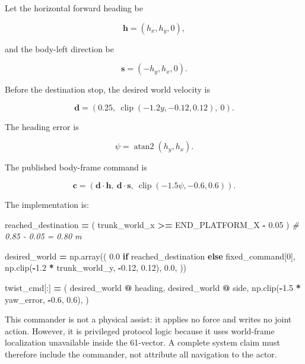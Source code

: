 \documentclass[
  american,
  11pt,
  letterpaper,
]{article}
\newenvironment{Shaded}{\begin{snugshade}}{\end{snugshade}}
\newcommand{\CommentTok}[1]{\textcolor[rgb]{0.56,0.35,0.01}{\textit{#1}}}
\newcommand{\ControlFlowTok}[1]{\textcolor[rgb]{0.13,0.29,0.53}{\textbf{#1}}}
\newcommand{\DecValTok}[1]{\textcolor[rgb]{0.00,0.00,0.81}{#1}}
\newcommand{\FloatTok}[1]{\textcolor[rgb]{0.00,0.00,0.81}{#1}}
\newcommand{\NormalTok}[1]{#1}
\newcommand{\OperatorTok}[1]{\textcolor[rgb]{0.81,0.36,0.00}{\textbf{#1}}}
\renewenvironment{Shaded}{\par\smallskip}{\par\smallskip}
\begin{document}
Let the horizontal forward heading be

\[
\mathbf h=(h_x,h_y,0),
\]

and the body-left direction be

\[
\mathbf s=(-h_y,h_x,0).
\]

Before the destination stop, the desired world velocity is

\[
\mathbf d=
\left(
0.25,\
\operatorname{clip}(-1.2y,-0.12,0.12),\
0
\right).
\]

The heading error is

\[
\psi=\operatorname{atan2}(h_y,h_x).
\]

The published body-frame command is

\[
\mathbf c=
\left(
\mathbf d\cdot\mathbf h,\
\mathbf d\cdot\mathbf s,\
\operatorname{clip}(-1.5\psi,-0.6,0.6)
\right).
\]

The implementation is:

\begin{Shaded}
\begin{Highlighting}[]
\NormalTok{reached\_destination }\OperatorTok{=}\NormalTok{ (}
\NormalTok{    trunk\_world\_x }\OperatorTok{\textgreater{}=}\NormalTok{ END\_PLATFORM\_X }\OperatorTok{{-}} \FloatTok{0.05}
\NormalTok{)  }\CommentTok{\# 0.85 {-} 0.05 = 0.80 m}

\NormalTok{desired\_world }\OperatorTok{=}\NormalTok{ np.array((}
    \FloatTok{0.0} \ControlFlowTok{if}\NormalTok{ reached\_destination }\ControlFlowTok{else}\NormalTok{ fixed\_command[}\DecValTok{0}\NormalTok{],}
\NormalTok{    np.clip(}\OperatorTok{{-}}\FloatTok{1.2} \OperatorTok{*}\NormalTok{ trunk\_world\_y, }\OperatorTok{{-}}\FloatTok{0.12}\NormalTok{, }\FloatTok{0.12}\NormalTok{),}
    \FloatTok{0.0}\NormalTok{,}
\NormalTok{))}

\NormalTok{twist\_cmd[:] }\OperatorTok{=}\NormalTok{ (}
\NormalTok{    desired\_world }\OperatorTok{@}\NormalTok{ heading,}
\NormalTok{    desired\_world }\OperatorTok{@}\NormalTok{ side,}
\NormalTok{    np.clip(}\OperatorTok{{-}}\FloatTok{1.5} \OperatorTok{*}\NormalTok{ yaw\_error, }\OperatorTok{{-}}\FloatTok{0.6}\NormalTok{, }\FloatTok{0.6}\NormalTok{),}
\NormalTok{)}
\end{Highlighting}
\end{Shaded}

This commander is not a physical assist: it applies no force and writes
no joint action. However, it is privileged protocol logic because it
uses world-frame localization unavailable inside the 61-vector. A
complete system claim must therefore include the commander, not
attribute all navigation to the actor.
\end{document}
